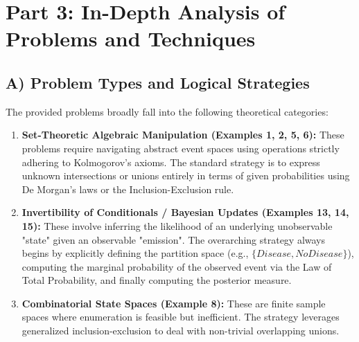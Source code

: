\documentclass[12pt, a4paper]{article}
\theoremstyle{definition}
\theoremstyle{remark}
\newcommand{\1}{\mathbf{1}}
\begin{document}
\newpage

\section{Part 3: In-Depth Analysis of Problems and Techniques}

\subsection{A) Problem Types and Logical Strategies}
The provided problems broadly fall into the following theoretical categories:
\begin{enumerate}
    \item \textbf{Set-Theoretic Algebraic Manipulation (Examples 1, 2, 5, 6):} These problems require navigating abstract event spaces using operations strictly adhering to Kolmogorov's axioms. The standard strategy is to express unknown intersections or unions entirely in terms of given probabilities using De Morgan's laws or the Inclusion-Exclusion rule.
    \item \textbf{Invertibility of Conditionals / Bayesian Updates (Examples 13, 14, 15):} These involve inferring the likelihood of an underlying unobservable "state" given an observable "emission". The overarching strategy always begins by explicitly defining the partition space (e.g., $\{Disease, No Disease\}$), computing the marginal probability of the observed event via the Law of Total Probability, and finally computing the posterior measure.
    \item \textbf{Combinatorial State Spaces (Example 8):} These are finite sample spaces where enumeration is feasible but inefficient. The strategy leverages generalized inclusion-exclusion to deal with non-trivial overlapping unions.
\end{enumerate}
\end{document}
